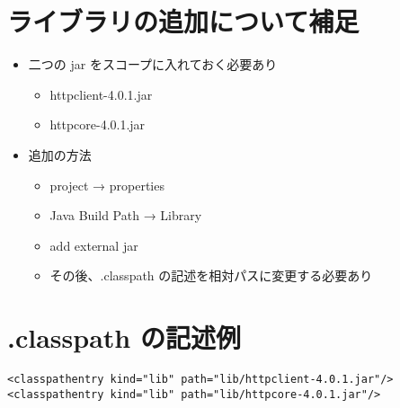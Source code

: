 \documentclass[slide,papersize]{jsarticle}
\begin{document}
\section*{ライブラリの追加について補足}
\begin{itemize}
\item 二つの jar をスコープに入れておく必要あり
 \begin{itemize}
 \item {\footnotesize httpclient-4.0.1.jar}
 \item {\footnotesize httpcore-4.0.1.jar}
 \end{itemize}
\item 追加の方法
 \begin{itemize}
 \item project → properties
 \item Java Build Path → Library
 \item add external jar
 \item {\footnotesize その後、.classpath の記述を相対パスに変更する必要あり}
 \end{itemize}
\end{itemize}

\section*{.classpath の記述例}
{\tiny
\begin{verbatim}
<classpathentry kind="lib" path="lib/httpclient-4.0.1.jar"/>
<classpathentry kind="lib" path="lib/httpcore-4.0.1.jar"/>
\end{verbatim}
}
\end{document}
